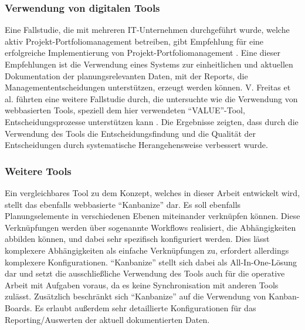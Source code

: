 \subsubsection{Verwendung von digitalen Tools}
Eine Fallstudie, die mit mehreren IT-Unternehmen durchgeführt wurde, welche aktiv Projekt-Portfoliomanagement betreiben, gibt Empfehlung für eine erfolgreiche Implementierung von Projekt-Portfoliomanagement \cite{guidelinesForPortfoliomanagement}.
Eine dieser Empfehlungen ist die Verwendung eines Systems zur einheitlichen und aktuellen Dokumentation der planungsrelevanten Daten, mit der Reports, die Managemententscheidungen unterstützen, erzeugt werden können.
V. Freitas et al. führten eine weitere Fallstudie durch, die untersuchte wie die Verwendung von webbasierten Tools, speziell dem hier verwendeten ``VALUE''-Tool, Entscheidungsprozesse unterstützen kann \cite{Value-Based-Decision-Making-Case-Study}. Die Ergebnisse zeigten, dass durch die Verwendung des Tools die Entscheidungsfindung und die Qualität der Entscheidungen durch systematische Herangehensweise verbessert wurde.

\subsubsection{Weitere Tools}
Ein vergleichbares Tool zu dem Konzept, welches in dieser Arbeit entwickelt wird, stellt das ebenfalls webbasierte ``Kanbanize'' dar. Es soll ebenfalls Planungselemente in verschiedenen Ebenen miteinander verknüpfen können. Diese Verknüpfungen werden über sogenannte Workflows realisiert, die Abhängigkeiten abbilden können, und dabei sehr spezifisch konfiguriert werden. Dies lässt komplexere Abhängigkeiten als einfache Verknüpfungen zu, erfordert allerdings komplexere Konfigurationen. ``Kanbanize'' stellt sich dabei als All-In-One-Lösung dar und setzt die ausschließliche Verwendung des Tools auch für die operative Arbeit mit Aufgaben voraus, da es keine Synchronisation mit anderen Tools zulässt. Zusätzlich beschränkt sich ``Kanbanize'' auf die Verwendung von Kanban-Boards. Es erlaubt außerdem sehr detaillierte Konfigurationen für das Reporting/Auswerten der aktuell dokumentierten Daten.
